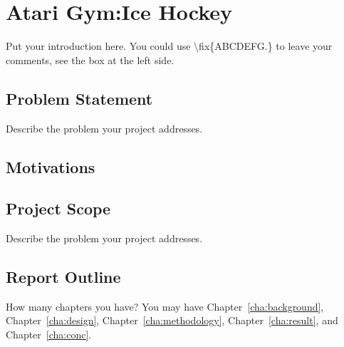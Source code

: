 \chapter{Atari Gym:Ice Hockey}
\label{cha:intro}

Put your introduction here. You could use \textbackslash fix\{ABCDEFG.\}
to leave your comments, see the box at the left side.



\section{Problem Statement}
\label{sec:problemstatement}
Describe the problem your project addresses.


\section{Motivations}
\label{sec:motivations}


\section{Project Scope}
\label{sec:projectscope}
Describe the problem your project addresses.


\section{Report Outline}
\label{sec:outline}

How many chapters you have? You may have Chapter~\ref{cha:background},
Chapter~\ref{cha:design}, Chapter~\ref{cha:methodology},
Chapter~\ref{cha:result}, and Chapter~\ref{cha:conc}.
